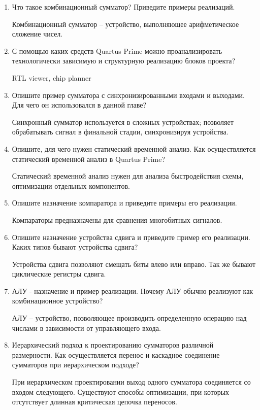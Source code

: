 \documentclass[a4paper,14pt]{article}
\begin{document}
	\begin{enumerate}
		\item Что такое комбинационный сумматор? Приведите примеры реализаций.
		
		Комбинационный сумматор -- устройство, выполняющее арифметическое сложение чисел.
		
		\item С помощью каких средств Quartus Prime можно проанализировать технологически
		зависимую и структурную реализацию блоков проекта?
		
		RTL viewer, chip planner
		
		\item Опишите пример сумматора с синхронизированными входами и выходами. Для чего
		он использовался в данной главе?
		
		Синхронный сумматор используется в сложных устройствах;
		позволяет обрабатывать сигнал в финальной стадии, синхронизируя устройства.
		
		\item Опишите, для чего нужен статический временной анализ. Как осуществляется
		статический временной анализ в Quartus Prime?
		
		Статический временной анализ нужен для анализа быстродействия схемы, оптимизации отдельных компонентов.
		
		\item Опишите назначение компаратора и приведите примеры его реализации.
		
		Компараторы предназначены для сравнения многобитных сигналов.
		
		\item Опишите назначение устройства сдвига и приведите пример его реализации. Каких
		типов бывают устройства сдвига?
		
		Устройства сдвига позволяют смещать биты влево или вправо. 
		Так же бывают циклические регистры сдвига.
		
		\item АЛУ - назначение и пример реализации. Почему АЛУ обычно реализуют как
		комбинационное устройство?
		
		АЛУ -- устройство, позволяющее производить определенную операцию над числами в зависимости от управляющего входа.
		
		\item Иерархический подход к проектированию сумматоров различной размерности. Как
		осуществляется перенос и каскадное соединение сумматоров при иерархическом
		подходе?
		
		При иерархическом проектировании выход одного сумматора соединяется со входом следующего.
		Существуют способы оптимизации, при которых отсутствует длинная критическая цепочка переносов.
		

\end{enumerate}
\end{document}
